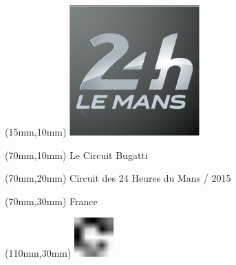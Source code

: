 \null\newpage
\begin{textblock*}{50mm}(15mm,10mm)%
\includegraphics[width=50mm]{LG/2015-05-20_00084.png}
\end{textblock*}
\begin{textblock*}{130mm}(70mm,10mm)%
{\fontsize{20}{20}\selectfont Le Circuit Bugatti}\\
\end{textblock*}
\begin{textblock*}{120mm}(70mm,20mm)%
{\fontsize{16}{16}\selectfont Circuit des 24 Heures du Mans / 2015}\\
\end{textblock*}
\begin{textblock*}{120mm}(70mm,30mm)%
{\fontsize{12}{12}\selectfont France}
\end{textblock*}
\begin{textblock*}{30mm}(110mm,30mm)%
\centering
\includegraphics[height=15mm]{icons/fa-rotate-right.pdf}
\end{textblock*}
